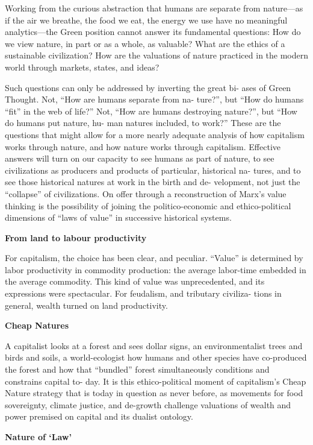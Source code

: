 \documentclass[
]{book}
\begin{document}
Working from the curious abstraction that humans are separate
from nature---as if the air we breathe, the food we eat, the energy we
use have no meaningful analytics---the Green position cannot answer
its fundamental questions: How do we view nature, in part or as a
whole, as valuable? What are the ethics of a sustainable civilization?
How are the valuations of nature practiced in the modern world
through markets, states, and ideas?

Such questions can only be addressed by inverting the great bi-
ases of Green Thought. Not, ``How are humans separate from na-
ture?'', but ``How do humans ``fit'' in the web of life?'' Not, ``How are
humans destroying nature?'', but ``How do humans put nature, hu-
man natures included, to work?'' These are the questions that might
allow for a more nearly adequate analysis of how capitalism works
through nature, and how nature works through capitalism. Effective
answers will turn on our capacity to see humans as part of nature, to
see civilizations as producers and products of particular, historical na-
tures, and to see those historical natures at work in the birth and de-
velopment, not just the ``collapse'' of civilizations. On offer through a
reconstruction of Marx's value thinking is the possibility of joining
the politico-economic and ethico-political dimensions of ``laws of
value'' in successive historical systems.

\textbf{From land to labour productivity}

For capitalism, the choice has
been clear, and peculiar. ``Value'' is determined by labor productivity
in commodity production: the average labor-time embedded in the
average commodity. This kind of value was unprecedented, and its
expressions were spectacular. For feudalism, and tributary civiliza-
tions in general, wealth turned on land productivity.

\textbf{Cheap Natures}

A capitalist looks at a forest and sees dollar signs,
an environmentalist trees and birds and soils, a world-ecologist how
humans and other species have co-produced the forest and how that
``bundled'' forest simultaneously conditions and constrains capital to-
day. It is this ethico-political moment of capitalism's Cheap Nature
strategy that is today in question as never before, as movements for
food sovereignty, climate justice, and de-growth challenge valuations
of wealth and power premised on capital and its dualist ontology.

\textbf{Nature of `Law'}
\end{document}
